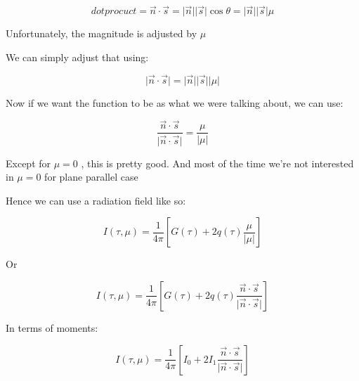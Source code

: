 \documentclass[12pt]{article}
\renewcommand{\_}{\kern-1.5pt\textunderscore\kern-1.5pt}
\begin{document}
\begin{itemize}
\vspace{\baselineskip}
 \[ dot procuct=\overrightarrow{n} \cdot \overrightarrow{s}= \vert \overrightarrow{n} \vert  \vert \overrightarrow{s} \vert \cos  \theta = \vert \overrightarrow{n} \vert  \vert \overrightarrow{s} \vert  \mu  \] \par

Unfortunately, the magnitude is adjusted by  \(  \mu  \) \par

We can simply adjust that using:\par

 \[  \vert \overrightarrow{n} \cdot \overrightarrow{s} \vert = \vert \overrightarrow{n} \vert  \vert \overrightarrow{s} \vert  \vert  \mu  \vert  \] \par

Now if we want the function to be as what we were talking about, we can use:\par

 \[ \frac{\overrightarrow{n} \cdot \overrightarrow{s}}{ \vert \overrightarrow{n} \cdot \overrightarrow{s} \vert }=\frac{ \mu }{ \vert  \mu  \vert } \] \par

Except for  \(  \mu =0 \) , this is pretty good. And most of the time we’re not interested in  \(  \mu =0 \)  for plane parallel case\par

Hence we can use a radiation field like so:\par

 \[ I \left(  \tau, \mu  \right) =\frac{1}{4 \pi } \left[ G \left(  \tau \right) +2q \left(  \tau \right) \frac{ \mu }{ \vert  \mu  \vert } \right]  \] \par

Or \par

 \[ I \left(  \tau, \mu  \right) =\frac{1}{4 \pi } \left[ G \left(  \tau \right) +2q \left(  \tau \right) \frac{\overrightarrow{n} \cdot \overrightarrow{s}}{ \vert \overrightarrow{n} \cdot \overrightarrow{s} \vert } \right]  \] \par

In terms of moments:\par

 \[ I \left(  \tau, \mu  \right) =\frac{1}{4 \pi } \left[ I_{0}+2I_{1}\frac{\overrightarrow{n} \cdot \overrightarrow{s}}{ \vert \overrightarrow{n} \cdot \overrightarrow{s} \vert } \right]  \] \par



\end{itemize}
\end{document}
